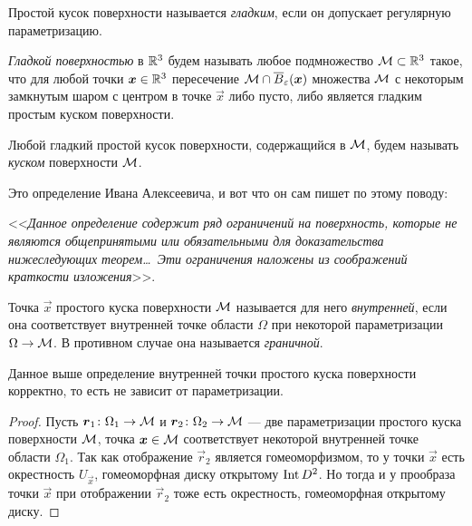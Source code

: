 
\begin{definition}
	Простой кусок поверхности называется \textit{гладким}, если он допускает регулярную параметризацию.

	\textit{Гладкой поверхностью} в $\mathbb{R}^3$ будем называть любое подмножество $\mathcal{M} \subset \mathbb{R}^3$ такое, что для любой точки $\boldsymbol{x} \in \mathbb{R}^3$ пересечение $\mathcal{M} \cap \overline{B}_\varepsilon(\boldsymbol{x})$ множества $\mathcal{M}$ с некоторым замкнутым шаром с центром в точке $\vec{x}$ либо пусто, либо является гладким простым куском поверхности.

	Любой гладкий простой кусок поверхности, содержащийся в $\mathcal{M}$, будем называть \textit{куском} поверхности $\mathcal{M}$.
\end{definition}

\noindent%
Это определение Ивана Алексеевича, и вот что он сам пишет по этому поводу:

\begin{center}
	<<\textit{Данное определение содержит ряд ограничений на поверхность, которые не являются общепринятыми или обязательными для доказательства нижеследующих теорем\ldots\ Эти ограничения наложены из соображений краткости изложения}>>.
\end{center}

\begin{definition}
	Точка $\vec{x}$ простого куска поверхности $\mathcal{M}$ называется для него \textit{внутренней}, если она соответствует внутренней точке области $\Omega$ при некоторой параметризации $\Omega \to \mathcal{M}$. В противном случае она называется \textit{граничной}.
\end{definition}

\begin{proposition}
	Данное выше определение внутренней точки простого куска поверхности корректно, то есть не зависит от параметризации.
\end{proposition}

\begin{proof}
	Пусть $\boldsymbol{r}_1\colon \Omega_1 \to \mathcal{M}$ и $\boldsymbol{r}_2\colon \Omega_2 \to \mathcal{M}$ --- две параметризации простого куска поверхности $\mathcal{M}$, точка $\boldsymbol{x} \in \mathcal{M}$ соответствует некоторой внутренней точке области $\Omega_1$. Так как отображение $\vec{r}_2$ является гомеоморфизмом, то у точки $\vec{x}$ есть окрестность $U_{\vec{x}}$, гомеоморфная диску открытому $\operatorname{Int} D^2$. Но тогда и у прообраза точки $\vec{x}$ при отображении $\vec{r}_2$ тоже есть окрестность, гомеоморфная открытому диску.
\end{proof}

